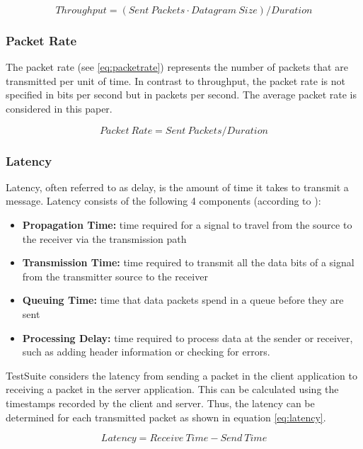 \begin{equation}
Throughput = (Sent\ Packets \cdot Datagram\ Size) / Duration
\label{eq:throughput}
\end{equation}

\subsubsection{Packet Rate}
The packet rate (see \ref{eq:packetrate}) represents the number of packets that are transmitted per unit of time. In contrast to throughput, the packet rate is not specified in bits per second but in packets per second. The average packet rate is considered in this paper.


\begin{equation}
Packet\ Rate = Sent\ Packets / Duration
\label{eq:packetrate}
\end{equation}

\subsubsection{Latency} \label{chap:LatencyExplanation}
Latency, often referred to as delay, is the amount of time it takes to transmit a message. Latency consists of the following 4 components (according to \cite{datacalc02}):

\begin{itemize}
	\item \textbf{Propagation Time:} time required for a signal to travel from the source to the receiver via the transmission path
	\item \textbf{Transmission Time:} time required to transmit all the data bits of a signal from the transmitter source to the receiver
	\item \textbf{Queuing Time:} time that data packets spend in a queue before they are sent
	\item \textbf{Processing Delay:} time required to process data at the sender or receiver, such as adding header information or checking for errors.
\end{itemize}

TestSuite considers the latency from sending a packet in the client application to receiving a packet in the server application. This can be calculated using the timestamps recorded by the client and server. Thus, the latency can be determined for each transmitted packet as shown in equation \ref{eq:latency}.

\begin{equation}
Latency = Receive\ Time - Send\ Time
\label{eq:latency}
\end{equation}

